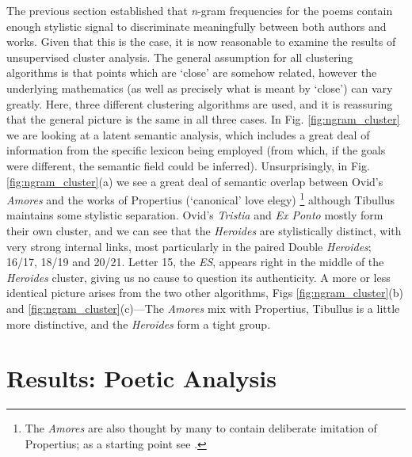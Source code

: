 \documentclass[twocolumn, switch, a4paper]{article} %
\begin{document}
The previous section established that \emph{n}-gram frequencies for the poems
contain enough stylistic signal to discriminate meaningfully between both
authors and works. Given that this is the case, it is now reasonable to
examine the results of unsupervised cluster analysis. The general assumption
for all clustering algorithms is that points which are `close' are somehow
related, however the underlying mathematics (as well as precisely what is
meant by `close') can vary greatly. Here, three different clustering
algorithms are used, and it is reassuring that the general picture is the same
in all three cases. In Fig. \ref{fig:ngram_cluster} we are looking at a latent
semantic analysis, which includes a great deal of information from the
specific lexicon being employed (from which, if the goals were different, the
semantic field could be inferred). Unsurprisingly, in Fig.
\ref{fig:ngram_cluster}(a) we see a great deal of semantic overlap between
Ovid's \emph{Amores} and the works of Propertius (`canonical' love elegy)%
%
    \footnote{The \emph{Amores} are also thought by many to contain deliberate
    imitation of Propertius; as a starting point see .}
%
although Tibullus maintains some stylistic separation. Ovid's \emph{Tristia}
and \emph{Ex Ponto} mostly form their own cluster, and we can see that the
\emph{Heroides} are stylistically distinct, with very strong internal links,
most particularly in the paired Double \emph{Heroides}; 16/17, 18/19 and
20/21. Letter 15, the \emph{ES}, appears right in the middle of the
\emph{Heroides} cluster, giving us no cause to question its authenticity. A
more or less identical picture arises from the two other algorithms, Figs
\ref{fig:ngram_cluster}(b) and \ref{fig:ngram_cluster}(c)---The \emph{Amores}
mix with Propertius, Tibullus is a little more distinctive, and the
\emph{Heroides} form a tight group.

\section{Results: Poetic Analysis}
\label{sec: poetic}
\end{document}
